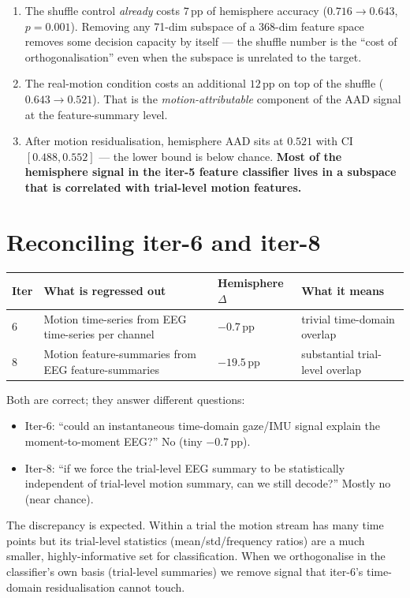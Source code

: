 \begin{enumerate}
  \item The shuffle control \emph{already} costs $7$\,pp of hemisphere
        accuracy ($0.716 \to 0.643$, $p = 0.001$). Removing any 71-dim
        subspace of a 368-dim feature space removes some decision
        capacity by itself --- the shuffle number is the ``cost of
        orthogonalisation'' even when the subspace is unrelated to
        the target.
  \item The real-motion condition costs an additional $12$\,pp on top
        of the shuffle ($0.643 \to 0.521$). That is the
        \emph{motion-attributable} component of the AAD signal at the
        feature-summary level.
  \item After motion residualisation, hemisphere AAD sits at
        $0.521$ with CI $[0.488, 0.552]$ --- the lower bound is below
        chance. \textbf{Most of the hemisphere signal in the iter-5
        feature classifier lives in a subspace that is correlated
        with trial-level motion features.}
\end{enumerate}

\section{Reconciling iter-6 and iter-8}

\begin{center}
\begin{tabular}{llll}
\toprule
Iter & What is regressed out & Hemisphere $\Delta$ & What it means \\
\midrule
6 & Motion time-series from EEG time-series per channel        & $-0.7$\,pp & trivial time-domain overlap \\
8 & Motion feature-summaries from EEG feature-summaries        & $-19.5$\,pp & substantial trial-level overlap \\
\bottomrule
\end{tabular}
\end{center}

Both are correct; they answer different questions:
\begin{itemize}
  \item Iter-6: ``could an instantaneous time-domain gaze/IMU signal
        explain the moment-to-moment EEG?'' No (tiny $-0.7$\,pp).
  \item Iter-8: ``if we force the trial-level EEG summary to be
        statistically independent of trial-level motion summary, can
        we still decode?'' Mostly no (near chance).
\end{itemize}
The discrepancy is expected. Within a trial the motion stream has
many time points but its trial-level statistics (mean/std/frequency
ratios) are a much smaller, highly-informative set for classification.
When we orthogonalise in the classifier's own basis (trial-level
summaries) we remove signal that iter-6's time-domain residualisation
cannot touch.

